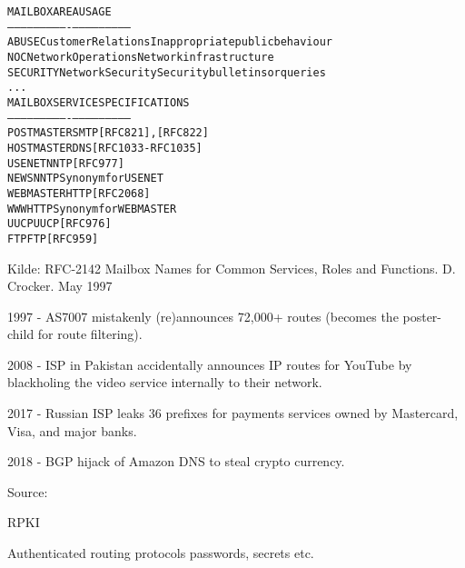 \documentclass[Screen16to9,17pt]{foils}
\begin{document}

\begin{alltt}\small
MAILBOX       AREA                USAGE
-----------   ----------------    ---------------------------
ABUSE         Customer Relations  Inappropriate public behaviour
NOC           Network Operations  Network infrastructure
SECURITY      Network Security    Security bulletins or queries
...
MAILBOX       SERVICE             SPECIFICATIONS
-----------   ----------------    ---------------------------
POSTMASTER    SMTP                [RFC821], [RFC822]
HOSTMASTER    DNS                 [RFC1033-RFC1035]
USENET        NNTP                [RFC977]
NEWS          NNTP                Synonym for USENET
WEBMASTER     HTTP                [RFC 2068]
WWW           HTTP                Synonym for WEBMASTER
UUCP          UUCP                [RFC976]
FTP           FTP                 [RFC959]
\end{alltt}

Kilde:
RFC-2142 Mailbox Names for Common Services, Roles and Functions. D.
Crocker. May 1997




{\small{}}



\begin{list2}
\item 1997 - AS7007 mistakenly (re)announces 72,000+ routes (becomes the poster-child for route filtering).
\item 2008 - ISP in Pakistan accidentally announces IP routes for YouTube by blackholing the video service internally to their network.
\item 2017 - Russian ISP leaks 36 prefixes for payments services owned by Mastercard, Visa, and major banks.
\item 2018 - BGP hijack of Amazon DNS to steal crypto currency.
\end{list2}
Source: 

\begin{list1}
\item RPKI 
\item Authenticated routing protocols passwords, secrets etc.
\end{list1}
\end{document}
